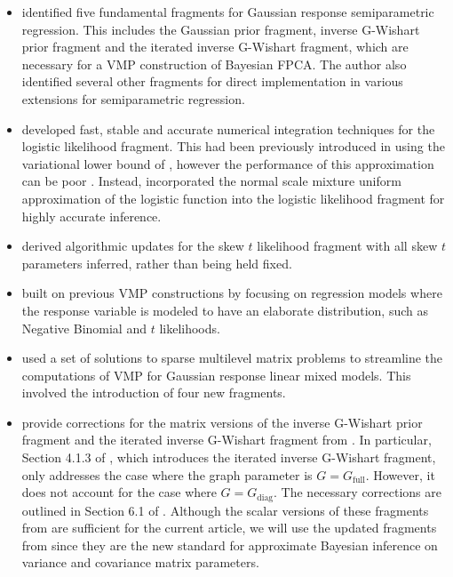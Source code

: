 \documentclass[12pt]{article}
\theoremstyle{plain}
\theoremstyle{definition}
\theoremstyle{remark}
\begin{document}
\begin{itemize}
	\item {} identified five fundamental fragments for Gaussian response semiparametric regression.
	This includes the Gaussian prior fragment, inverse G-Wishart prior fragment and the iterated inverse
	G-Wishart fragment, which are necessary for a VMP construction of Bayesian FPCA. The author also
	identified several other fragments for direct implementation in various extensions for semiparametric
	regression.
	\item {} developed fast, stable and accurate numerical integration techniques for 
	the logistic likelihood fragment. This had been previously introduced in  using the
	variational lower bound of , however the performance of this approximation can be poor
	\cite{knowles11}. Instead,  incorporated the normal scale mixture uniform approximation of
	the logistic function \cite{monahan92} into the logistic likelihood fragment for highly accurate inference.
	\item {} derived algorithmic updates for the skew $t$ likelihood fragment with all skew $t$
	parameters inferred, rather than being held fixed.
	\item {} built on previous VMP constructions by focusing on regression models where
	the response variable is modeled to have an elaborate distribution, such as Negative Binomial and
	$t$ likelihoods.
	\item {} used a set of solutions to sparse multilevel matrix problems \cite{nolan19} to
	streamline the computations of VMP for Gaussian response linear mixed models. This involved the
	introduction of four new fragments.
	\item {} provide corrections for the matrix versions of the inverse G-Wishart prior fragment
	and the iterated inverse G-Wishart fragment from . In particular, Section 4.1.3 of
	, which introduces the iterated inverse G-Wishart fragment, only addresses the case where
	the graph parameter is $G = G_{\text{full}}$. However, it does not account for the case where $G = G_{\text{diag}}$.
	The necessary corrections are outlined in Section 6.1 of . Although the scalar versions of these
	fragments from  are sufficient for the current article, we will use the updated fragments
	from  since they are the new standard for approximate Bayesian inference on variance
	and covariance matrix parameters.
\end{itemize}
\end{document}
